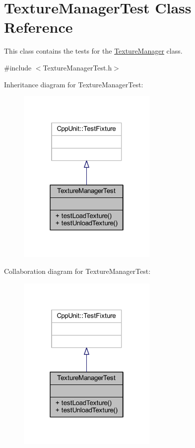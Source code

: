 \hypertarget{class_texture_manager_test}{\section{Texture\+Manager\+Test Class Reference}
\label{class_texture_manager_test}
}


This class contains the tests for the \hyperlink{class_texture_manager}{Texture\+Manager} class.  




{\ttfamily \#include $<$Texture\+Manager\+Test.\+h$>$}



Inheritance diagram for Texture\+Manager\+Test\+:
\nopagebreak
\begin{figure}[H]
\begin{center}
\leavevmode
\includegraphics[width=190pt]{class_texture_manager_test__inherit__graph}
\end{center}
\end{figure}


Collaboration diagram for Texture\+Manager\+Test\+:
\nopagebreak
\begin{figure}[H]
\begin{center}
\leavevmode
\includegraphics[width=190pt]{class_texture_manager_test__coll__graph}
\end{center}
\end{figure}
